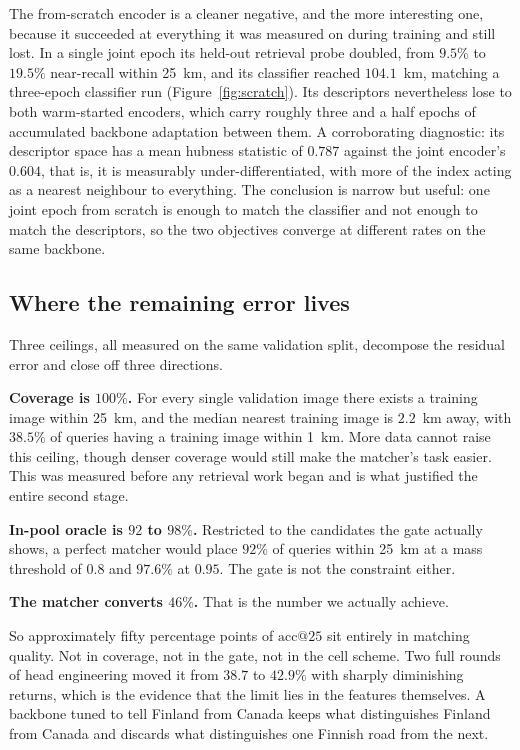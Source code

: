 \documentclass[11pt,a4paper]{article}
\begin{document}
The from-scratch encoder is a cleaner negative, and the more interesting one, because it
succeeded at everything it was measured on during training and still lost. In a single joint
epoch its held-out retrieval probe doubled, from $9.5\%$ to $19.5\%$ near-recall within
25~km, and its classifier reached $104.1$~km, matching a three-epoch classifier run
(Figure~\ref{fig:scratch}). Its descriptors nevertheless lose to both warm-started encoders,
which carry roughly three and a half epochs of accumulated backbone adaptation between them.
A corroborating diagnostic: its descriptor space has a mean hubness statistic of $0.787$
against the joint encoder's $0.604$, that is, it is measurably under-differentiated, with more
of the index acting as a nearest neighbour to everything. The conclusion is narrow but useful:
one joint epoch from scratch is enough to match the classifier and not enough to match the
descriptors, so the two objectives converge at different rates on the same backbone.

\subsection{Where the remaining error lives}
\label{sec:ceilings}

Three ceilings, all measured on the same validation split, decompose the residual error and
close off three directions.

\textbf{Coverage is $100\%$.} For every single validation image there exists a training image
within 25~km, and the median nearest training image is $2.2$~km away, with $38.5\%$ of queries
having a training image within 1~km. More data cannot raise this ceiling, though denser
coverage would still make the matcher's task easier. This was measured before any
retrieval work began and is what justified the entire second stage.

\textbf{In-pool oracle is $92$ to $98\%$.} Restricted to the candidates the gate actually
shows, a perfect matcher would place $92\%$ of queries within 25~km at a mass threshold of
$0.8$ and $97.6\%$ at $0.95$. The gate is not the constraint either.

\textbf{The matcher converts $46\%$.} That is the number we actually achieve.

So approximately fifty percentage points of $\mathrm{acc@}25$ sit entirely in matching
quality. Not in coverage, not in the gate, not in the cell scheme. Two full rounds of head
engineering moved it from $38.7$ to $42.9\%$ with sharply diminishing returns, which is the
evidence that the limit lies in the features themselves. A backbone tuned to tell Finland from
Canada keeps what distinguishes Finland from Canada and discards what distinguishes one
Finnish road from the next.
\end{document}
